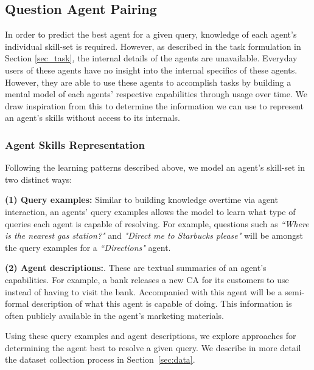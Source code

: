 \documentclass[11pt]{article}
\begin{document}
 \subsection{Question Agent Pairing}
 In order to predict the best agent for a given query, knowledge of each agent's individual skill-set is required. However, as described in the task formulation in Section \ref{sec_task}, the internal details of the agents are unavailable. Everyday users of these agents have no insight into the internal specifics of these agents. However, they are able to use these agents to accomplish tasks by building a mental model of each agents' respective capabilities through usage over time. 
We draw inspiration from this to determine the information we can use to represent an agent's skills without access to its internals.
 
 \subsubsection{Agent Skills Representation}
Following the learning patterns described above, we model an agent's skill-set in two distinct ways: 

\textbf{(1) Query examples:} Similar to building knowledge overtime via agent interaction, an agents' query examples allows the model to learn what type of queries each agent is capable of resolving. For example, questions such as \textit{``Where is the nearest gas station?"} and \textit{"Direct me to Starbucks please"} will be amongst the query examples for a \textit{``Directions"} agent.

\textbf{(2) Agent descriptions:}. These are textual summaries of an agent's capabilities. For example, a bank releases a new CA for its customers to use instead of having to visit the bank. Accompanied with this agent will be a semi-formal description of what this agent is capable of doing. This information is often publicly available in the agent's marketing materials.

Using these query examples and agent descriptions, we explore approaches for determining the agent best to resolve a given query. 
We describe in more detail the dataset collection process in Section~\ref{sec:data}.
\end{document}

